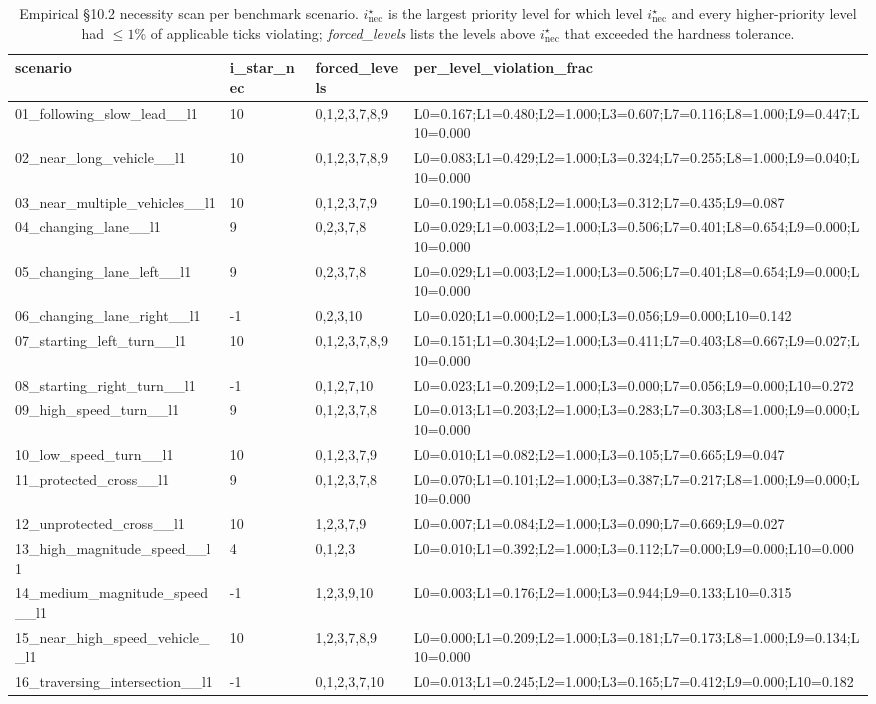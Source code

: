 \begin{table}[t]
    \centering
    \caption{Empirical \S10.2 necessity scan per benchmark scenario. $i^\star_{\mathrm{nec}}$ is the largest priority level for which level $i^\star_{\mathrm{nec}}$ and every higher-priority level had $\le 1\%$ of applicable ticks violating; \emph{forced\_levels} lists the levels above $i^\star_{\mathrm{nec}}$ that exceeded the hardness tolerance.}
    \label{tab:necessity}
    \footnotesize
\begin{tabular}{llll}
\toprule
scenario & i\_star\_nec & forced\_levels & per\_level\_violation\_frac \\
\midrule
01\_following\_slow\_lead\_\_l1 & 10 & 0,1,2,3,7,8,9 & L0=0.167;L1=0.480;L2=1.000;L3=0.607;L7=0.116;L8=1.000;L9=0.447;L10=0.000 \\
02\_near\_long\_vehicle\_\_l1 & 10 & 0,1,2,3,7,8,9 & L0=0.083;L1=0.429;L2=1.000;L3=0.324;L7=0.255;L8=1.000;L9=0.040;L10=0.000 \\
03\_near\_multiple\_vehicles\_\_l1 & 10 & 0,1,2,3,7,9 & L0=0.190;L1=0.058;L2=1.000;L3=0.312;L7=0.435;L9=0.087 \\
04\_changing\_lane\_\_l1 & 9 & 0,2,3,7,8 & L0=0.029;L1=0.003;L2=1.000;L3=0.506;L7=0.401;L8=0.654;L9=0.000;L10=0.000 \\
05\_changing\_lane\_left\_\_l1 & 9 & 0,2,3,7,8 & L0=0.029;L1=0.003;L2=1.000;L3=0.506;L7=0.401;L8=0.654;L9=0.000;L10=0.000 \\
06\_changing\_lane\_right\_\_l1 & -1 & 0,2,3,10 & L0=0.020;L1=0.000;L2=1.000;L3=0.056;L9=0.000;L10=0.142 \\
07\_starting\_left\_turn\_\_l1 & 10 & 0,1,2,3,7,8,9 & L0=0.151;L1=0.304;L2=1.000;L3=0.411;L7=0.403;L8=0.667;L9=0.027;L10=0.000 \\
08\_starting\_right\_turn\_\_l1 & -1 & 0,1,2,7,10 & L0=0.023;L1=0.209;L2=1.000;L3=0.000;L7=0.056;L9=0.000;L10=0.272 \\
09\_high\_speed\_turn\_\_l1 & 9 & 0,1,2,3,7,8 & L0=0.013;L1=0.203;L2=1.000;L3=0.283;L7=0.303;L8=1.000;L9=0.000;L10=0.000 \\
10\_low\_speed\_turn\_\_l1 & 10 & 0,1,2,3,7,9 & L0=0.010;L1=0.082;L2=1.000;L3=0.105;L7=0.665;L9=0.047 \\
11\_protected\_cross\_\_l1 & 9 & 0,1,2,3,7,8 & L0=0.070;L1=0.101;L2=1.000;L3=0.387;L7=0.217;L8=1.000;L9=0.000;L10=0.000 \\
12\_unprotected\_cross\_\_l1 & 10 & 1,2,3,7,9 & L0=0.007;L1=0.084;L2=1.000;L3=0.090;L7=0.669;L9=0.027 \\
13\_high\_magnitude\_speed\_\_l1 & 4 & 0,1,2,3 & L0=0.010;L1=0.392;L2=1.000;L3=0.112;L7=0.000;L9=0.000;L10=0.000 \\
14\_medium\_magnitude\_speed\_\_l1 & -1 & 1,2,3,9,10 & L0=0.003;L1=0.176;L2=1.000;L3=0.944;L9=0.133;L10=0.315 \\
15\_near\_high\_speed\_vehicle\_\_l1 & 10 & 1,2,3,7,8,9 & L0=0.000;L1=0.209;L2=1.000;L3=0.181;L7=0.173;L8=1.000;L9=0.134;L10=0.000 \\
16\_traversing\_intersection\_\_l1 & -1 & 0,1,2,3,7,10 & L0=0.013;L1=0.245;L2=1.000;L3=0.165;L7=0.412;L9=0.000;L10=0.182 \\
\bottomrule
\end{tabular}
\end{table}
